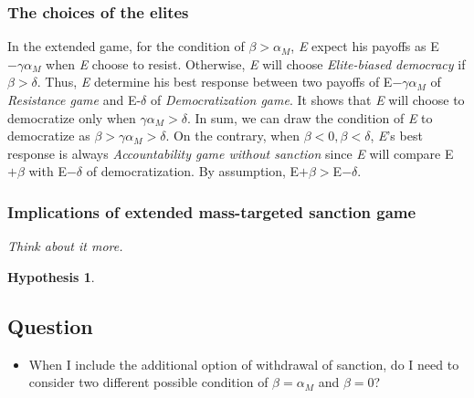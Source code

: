 \documentclass[11pt, letterpage, titlepage]{article}
\newtheorem{hyp}{Hypothesis}
\begin{document}
\subsubsection*{The choices of the elites}

In the extended game, for the condition of $\beta > \alpha_{M}$, \textit{E} expect his payoffs as E$-\gamma\alpha_{M}$ when \textit{E} choose to resist. Otherwise, \textit{E} will choose \textit{Elite-biased democracy} if $\beta > \delta$. Thus, \textit{E} determine his best response between two payoffs of E$-\gamma\alpha_{M}$ of \textit{Resistance game} and E-$\delta$ of \textit{Democratization game}. It shows that \textit{E} will choose to democratize only when $\gamma\alpha_{M} > \delta$. In sum, we can draw the condition of \textit{E} to democratize as $\beta > \gamma\alpha_{M} > \delta$.  On the contrary, when $\beta < 0, \beta < \delta$, \textit{E}'s best response is always \textit{Accountability game without sanction} since \textit{E} will compare E$+\beta$ with E$-\delta$ of democratization. By assumption, E$+\beta >$E$-\delta$.

\subsubsection*{Implications of extended mass-targeted sanction game}

\textit{Think about it more.}

\begin{hyp}
	\label{hyp3}
\end{hyp}

\subsection*{Question}
\begin{itemize}
	\item When I include the additional option of withdrawal of sanction, do I need to consider two different possible condition of $\beta = \alpha_{M}$ and $\beta = 0$?
\end{itemize}


	
	
	
\end{document}
